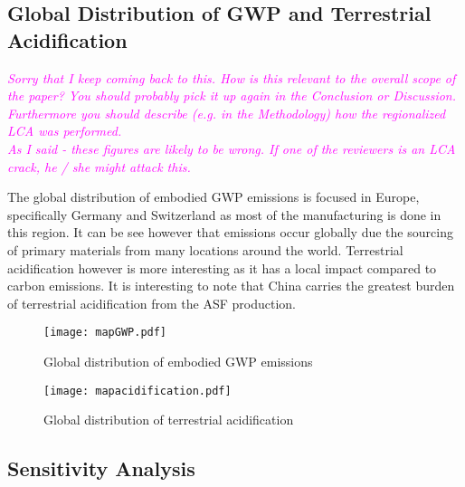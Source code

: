 \subsection{Global Distribution of GWP and Terrestrial Acidification}

\textcolor{magenta}{\textit{Sorry that I keep coming back to this. How is this relevant to the overall scope of the paper? You should probably pick it up again in the Conclusion or Discussion. Furthermore you should describe (e.g. in the Methodology) how the regionalized LCA was performed.\\
As I said - these figures are likely to be wrong. If one of the reviewers is an LCA crack, he / she might attack this.}}

The global distribution of embodied GWP emissions is focused in Europe, specifically Germany and Switzerland as most of the manufacturing is done in this region. It can be see however that emissions occur globally due the sourcing of primary materials from many locations around the world. Terrestrial acidification however is more interesting as it has a local impact compared to carbon emissions. It is interesting to note that China carries the greatest burden of terrestrial acidification from the ASF production.
 
\begin{figure}[H]
\begin{center}
\texttt{[image: mapGWP.pdf]}
\caption{Global distribution of embodied GWP emissions}
\label{fig:mapGWP}
\end{center}
\end{figure}

\begin{figure}[H]
\begin{center}
\texttt{[image: mapacidification.pdf]}
\caption{Global distribution of terrestrial acidification}
\label{fig:mapAcid}
\end{center}
\end{figure}

\subsection{Sensitivity Analysis}

